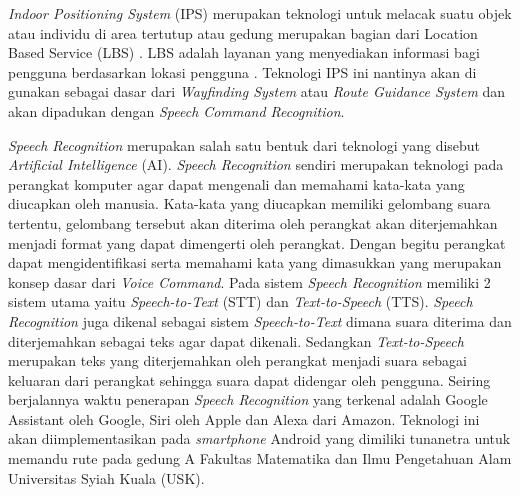 \par \textit{Indoor Positioning System} (IPS) merupakan teknologi untuk melacak suatu objek atau individu di area tertutup atau gedung merupakan bagian dari Location Based Service (LBS) \citep{brena2017evolution}. LBS adalah layanan yang menyediakan informasi bagi pengguna berdasarkan lokasi pengguna \citep{virrantaus2001developing}. Teknologi IPS ini nantinya akan di gunakan sebagai dasar dari \textit{Wayfinding System} atau \textit{Route Guidance System} dan akan dipadukan dengan \textit{Speech Command Recognition}.

\par \textit{Speech Recognition} merupakan salah satu bentuk dari teknologi yang disebut \textit{Artificial Intelligence} (AI). \textit{Speech Recognition} sendiri merupakan teknologi pada perangkat komputer agar dapat mengenali dan memahami kata-kata yang diucapkan oleh manusia. Kata-kata yang diucapkan memiliki gelombang suara tertentu, gelombang tersebut akan diterima oleh perangkat akan diterjemahkan menjadi format yang dapat dimengerti oleh perangkat. 
Dengan begitu perangkat dapat mengidentifikasi serta memahami kata yang dimasukkan yang merupakan konsep dasar dari \textit{Voice Command}. Pada sistem \textit{Speech Recognition} memiliki 2 sistem utama yaitu \textit{Speech-to-Text} (STT) dan \textit{Text-to-Speech} (TTS). \textit{Speech Recognition} juga dikenal sebagai sistem \textit{Speech-to-Text} dimana suara diterima dan diterjemahkan sebagai teks agar dapat dikenali. 
Sedangkan \textit{Text-to-Speech} merupakan teks yang diterjemahkan oleh perangkat menjadi suara sebagai keluaran dari perangkat sehingga suara dapat didengar oleh pengguna. Seiring berjalannya waktu penerapan \textit{Speech Recognition} yang terkenal adalah Google Assistant oleh Google, Siri oleh Apple dan Alexa dari Amazon. Teknologi ini akan diimplementasikan pada \textit{smartphone} Android yang dimiliki tunanetra untuk memandu rute pada gedung A Fakultas Matematika dan Ilmu Pengetahuan Alam Universitas Syiah Kuala (USK).

